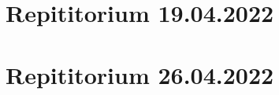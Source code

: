 \documentclass[a4paper,12pt]{article}
\begin{document}
\tableofcontents
\newpage
\section{Repititorium 19.04.2022}

\newpage
\section{Repititorium 26.04.2022}

\end{document}
